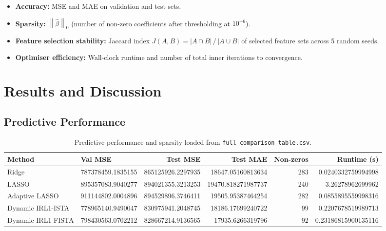 \documentclass[12pt,a4paper]{article}
\newcommand{\norm}[1]{\left\|#1\right\|}
\newcommand{\abs}[1]{\left|#1\right|}
\newcommand{\fmtpred}[1]{\num[round-mode=places,round-precision=2,group-separator={}]{#1}}
\begin{document}
\begin{itemize}[noitemsep]
    \item \textbf{Accuracy:} MSE and MAE on validation and test sets.
    \item \textbf{Sparsity:} $\norm{\hat{\beta}}_0$ (number of non-zero coefficients
          after thresholding at $10^{-6}$).
    \item \textbf{Feature selection stability:} Jaccard index
          $J(A,B) = \abs{A \cap B}\,/\,\abs{A \cup B}$ of selected feature sets across
          5 random seeds.
    \item \textbf{Optimiser efficiency:} Wall-clock runtime and number of total inner
        iterations to convergence.
\end{itemize}

\section{Results and Discussion}
\label{sec:results}

\subsection{Predictive Performance}

\begin{table}[H]
\centering
\caption{Predictive performance and sparsity loaded from \texttt{full\_comparison\_table.csv}.}
\label{tab:results}
\scriptsize
\begin{tabular}{llrrrr}
\toprule
\textbf{Method} & \textbf{Val MSE} & \textbf{Test MSE} & \textbf{Test MAE} & \textbf{Non-zeros} & \textbf{Runtime (s)}\\
\midrule
Ridge & \fmtpred{787378459.1835155} & \fmtpred{865125926.2297935} & \fmtpred{18647.05160813634} & 283 & \fmtpred{0.0240332759994998}\\
LASSO & \fmtpred{895357083.9040277} & \fmtpred{894021355.3213253} & \fmtpred{19470.818271987737} & 240 & \fmtpred{3.26278962699962}\\
Adaptive LASSO & \fmtpred{911144802.0004896} & \fmtpred{894529896.3746411} & \fmtpred{19505.95387464254} & 282 & \fmtpred{0.0855895559998316}\\
Dynamic IRL1-ISTA & \fmtpred{778965140.9490047} & \fmtpred{830975941.2048745} & \fmtpred{18186.17699240722} & 99 & \fmtpred{0.2207678519989713}\\
Dynamic IRL1-FISTA & \fmtpred{798430563.0702212} & \fmtpred{828667214.9136565} & \fmtpred{17935.6266319796} & 92 & \fmtpred{0.23186815900135116}\\
\bottomrule
\end{tabular}
\end{table}
\end{document}
